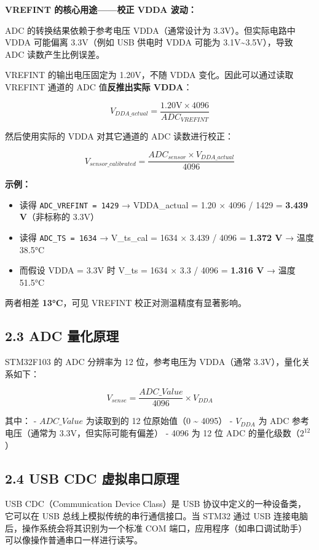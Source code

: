 \documentclass[
  chinese,
  UTF8,
  oneside,
  openany]{ctexbook}
\providecommand{\tightlist}{%
  \setlength{\itemsep}{0pt}\setlength{\parskip}{0pt}}
\begin{document}
\textbf{VREFINT 的核心用途------校正 VDDA 波动：}

ADC 的转换结果依赖于参考电压 VDDA（通常设计为 3.3V）。但实际电路中 VDDA
可能偏离 3.3V（例如 USB 供电时 VDDA 可能为
3.1V\textasciitilde3.5V），导致 ADC 读数产生比例误差。

VREFINT 的输出电压固定为 1.20V，不随 VDDA 变化。因此可以通过读取 VREFINT
通道的 ADC 值\textbf{反推出实际 VDDA}：

\[V_{DDA\_actual} = \frac{1.20\text{V} \times 4096}{ADC_{VREFINT}}\]

然后使用实际的 VDDA 对其它通道的 ADC 读数进行校正：

\[V_{sensor\_calibrated} = \frac{ADC_{sensor} \times V_{DDA\_actual}}{4096}\]

\textbf{示例：}

\begin{itemize}
\tightlist
\item
  读得 \texttt{ADC\_VREFINT\ =\ 1429} → VDDA\_actual = 1.20 × 4096 /
  1429 = \textbf{3.439 V}（非标称的 3.3V）
\item
  读得 \texttt{ADC\_TS\ =\ 1634} → V\_ts\_cal = 1634 × 3.439 / 4096 =
  \textbf{1.372 V} → 温度 38.5°C
\item
  而假设 VDDA = 3.3V 时 V\_ts = 1634 × 3.3 / 4096 = \textbf{1.316 V} →
  温度 51.5°C
\end{itemize}

两者相差 \textbf{13°C}，可见 VREFINT 校正对测温精度有显著影响。

\subsection{2.3 ADC 量化原理}\label{adc-ux91cfux5316ux539fux7406}

STM32F103 的 ADC 分辨率为 12 位，参考电压为 VDDA（通常
3.3V），量化关系如下：

\[V_{sense} = \frac{ADC\_Value}{4096} \times V_{DDA}\]

其中： - \(ADC\_Value\) 为读取到的 12 位原始值（0 \textasciitilde{}
4095） - \(V_{DDA}\) 为 ADC 参考电压（通常为 3.3V，但实际可能有偏差） -
4096 为 12 位 ADC 的量化级数（\(2^{12}\)）

\subsection{2.4 USB CDC
虚拟串口原理}\label{usb-cdc-ux865aux62dfux4e32ux53e3ux539fux7406}

USB CDC（Communication Device Class）是 USB
协议中定义的一种设备类，它可以在 USB 总线上模拟传统的串行通信接口。当
STM32 通过 USB 连接电脑后，操作系统会将其识别为一个标准 COM
端口，应用程序（如串口调试助手）可以像操作普通串口一样进行读写。
\end{document}
